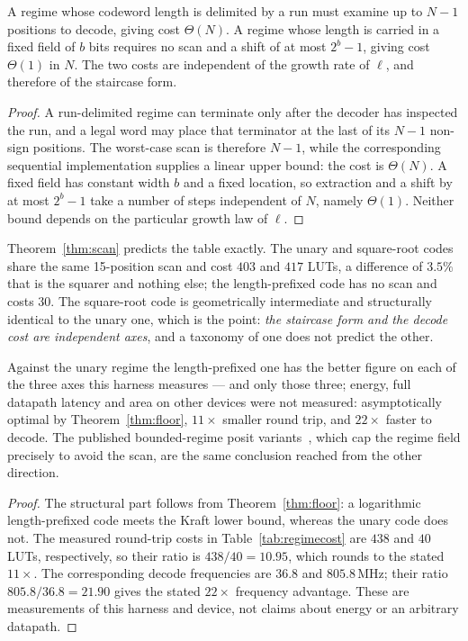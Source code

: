 \begin{theorem}
\label{thm:scan}
A regime whose codeword length is delimited by a run must examine up to $N-1$
positions to decode, giving cost $\Theta(N)$. A regime whose length is carried in
a fixed field of $b$ bits requires no scan and a shift of at most $2^{b}-1$,
giving cost $\Theta(1)$ in $N$. The two costs are independent of the growth rate
of $\ell$, and therefore of the staircase form.
\end{theorem}
\begin{proof}
A run-delimited regime can terminate only after the decoder has inspected the
run, and a legal word may place that terminator at the last of its $N-1$
non-sign positions.  The worst-case scan is therefore $N-1$, while the
corresponding sequential implementation supplies a linear upper bound: the
cost is $\Theta(N)$.  A fixed field has constant width $b$ and a fixed
location, so extraction and a shift by at most $2^b-1$ take a number of steps
independent of $N$, namely $\Theta(1)$.  Neither bound depends on the
particular growth law of $\ell$.
\end{proof}

Theorem~\ref{thm:scan} predicts the table exactly. The unary and square-root codes
share the same 15-position scan and cost $403$ and $417$ LUTs, a difference of
$3.5\%$ that is the squarer and nothing else; the length-prefixed code has no scan
and costs $30$. The square-root code is geometrically intermediate and structurally
identical to the unary one, which is the point: \emph{the staircase form and the
decode cost are independent axes}, and a taxonomy of one does not predict the
other.

\begin{corollary}
\label{cor:takumwins}
Against the unary regime the length-prefixed one has the better figure on each of
the three axes this harness measures --- and only those three; energy, full
datapath latency and area on other devices were not measured:
asymptotically optimal by Theorem~\ref{thm:floor}, $11\times$ smaller round trip,
and $22\times$ faster to decode. The published bounded-regime posit
variants~\cite{positgap}, which cap the regime field precisely to avoid the scan,
are the same conclusion reached from the other direction.
\end{corollary}
\begin{proof}
The structural part follows from Theorem~\ref{thm:floor}: a logarithmic
length-prefixed code meets the Kraft lower bound, whereas the unary code does
not.  The measured round-trip costs in Table~\ref{tab:regimecost} are
$438$ and $40$ LUTs, respectively, so their ratio is
$438/40=10.95$, which rounds to the stated $11\times$.  The corresponding
decode frequencies are $36.8$ and $805.8$\,MHz; their ratio
$805.8/36.8=21.90$ gives the stated $22\times$ frequency advantage.  These
are measurements of this harness and device, not claims about energy or an
arbitrary datapath.
\end{proof}

